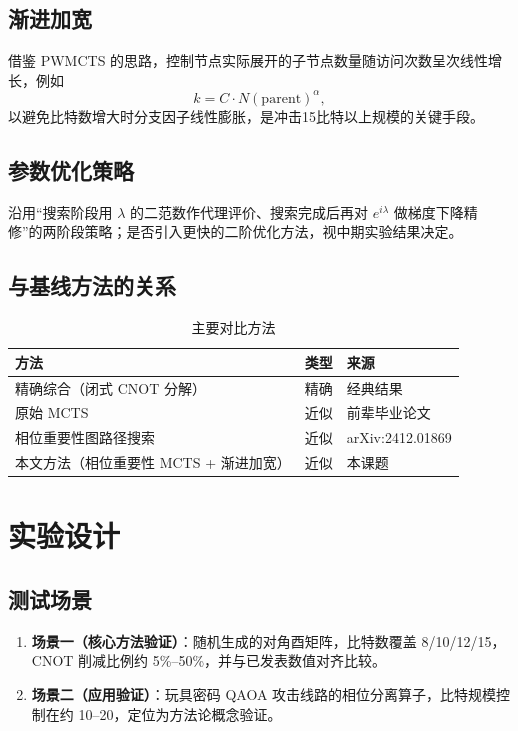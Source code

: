 \documentclass{HDU-Bachelor-Thesis}
\begin{document}
\subsection{渐进加宽}

借鉴 PWMCTS 的思路\cite{lipardi2025pwmcts}，控制节点实际展开的子节点数量随访问次数呈次线性增长，例如
\begin{equation}
  k=C\cdot N(\mathrm{parent})^{\alpha},
\end{equation}
以避免比特数增大时分支因子线性膨胀，是冲击15比特以上规模的关键手段。

\subsection{参数优化策略}

沿用“搜索阶段用 $\lambda$ 的二范数作代理评价、搜索完成后再对 $e^{i\lambda}$ 做梯度下降精修”的两阶段策略；是否引入更快的二阶优化方法，视中期实验结果决定。

\subsection{与基线方法的关系}

\begin{table}[htbp]
  \centering
  \caption{主要对比方法}
  \label{tab:baselines}
  \begin{tabular}{lll}
    \toprule
    方法 & 类型 & 来源 \\
    \midrule
    精确综合（闭式 CNOT 分解） & 精确 & 经典结果 \\
    原始 MCTS & 近似 & 前辈毕业论文 \\
    相位重要性图路径搜索 & 近似 & arXiv:2412.01869 \\
    本文方法（相位重要性 MCTS + 渐进加宽） & 近似 & 本课题 \\
    \bottomrule
  \end{tabular}
\end{table}

\clearpage
\section{实验设计}

\subsection{测试场景}

\begin{enumerate}
  \item \textbf{场景一（核心方法验证）}：随机生成的对角酉矩阵，比特数覆盖 8/10/12/15，CNOT 削减比例约 5\%--50\%，并与已发表数值对齐比较。
  \item \textbf{场景二（应用验证）}：玩具密码 QAOA 攻击线路的相位分离算子，比特规模控制在约 10--20，定位为方法论概念验证。
\end{enumerate}
\end{document}
